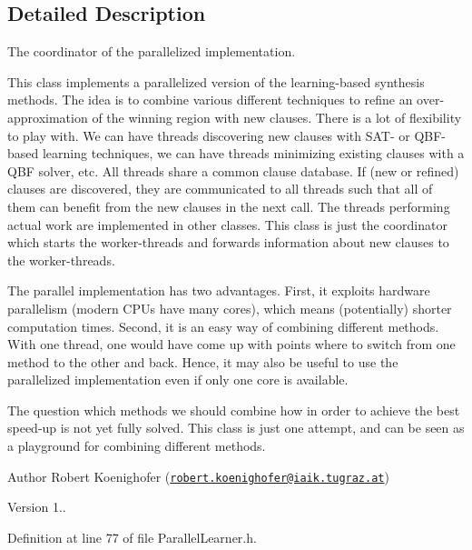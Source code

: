 \subsection{Detailed Description}
The coordinator of the parallelized implementation. 

This class implements a parallelized version of the learning-\/based synthesis methods. The idea is to combine various different techniques to refine an over-\/approximation of the winning region with new clauses. There is a lot of flexibility to play with. We can have threads discovering new clauses with S\-A\-T-\/ or Q\-B\-F-\/based learning techniques, we can have threads minimizing existing clauses with a Q\-B\-F solver, etc. All threads share a common clause database. If (new or refined) clauses are discovered, they are communicated to all threads such that all of them can benefit from the new clauses in the next call. The threads performing actual work are implemented in other classes. This class is just the coordinator which starts the worker-\/threads and forwards information about new clauses to the worker-\/threads.

The parallel implementation has two advantages. First, it exploits hardware parallelism (modern C\-P\-Us have many cores), which means (potentially) shorter computation times. Second, it is an easy way of combining different methods. With one thread, one would have come up with points where to switch from one method to the other and back. Hence, it may also be useful to use the parallelized implementation even if only one core is available.

The question which methods we should combine how in order to achieve the best speed-\/up is not yet fully solved. This class is just one attempt, and can be seen as a playground for combining different methods.

\begin{DoxyAuthor}{Author}
Robert Koenighofer (\href{mailto:robert.koenighofer@iaik.tugraz.at}{\tt robert.\-koenighofer@iaik.\-tugraz.\-at}) 
\end{DoxyAuthor}
\begin{DoxyVersion}{Version}
1.. 
\end{DoxyVersion}


Definition at line 77 of file Parallel\-Learner.\-h.



